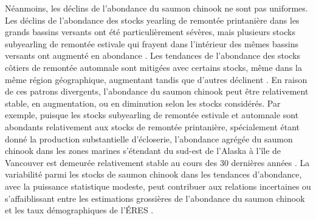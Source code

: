 Néanmoins, les déclins de l'abondance du saumon chinook ne sont pas uniformes. Les déclins de l'abondance des stocks yearling de remontée printanière dans les grands bassins versants ont été particulièrement sévères, mais plusieurs stocks subyearling de remontée estivale qui frayent dans l'intérieur des mêmes bassins versants ont augmenté en abondance \citep{cosewicChinookSalmonOncorhynchus2018, ctc2021AnnualReport2022, atlasTrendsChinookSalmon2023}. Les tendances de l'abondance des stocks côtiers de remontée automnale sont mitigées avec certains stocks, même dans la même région géographique, augmentant tandis que d'autres déclinent \citep{ctc2021AnnualReport2022, atlasTrendsChinookSalmon2023}. En raison de ces patrons divergents, l'abondance du saumon chinook peut être relativement stable, en augmentation, ou en diminution selon les stocks considérés. Par exemple, puisque les stocks subyearling de remontée estivale et automnale sont abondants relativement aux stocks de remontée printanière, spécialement étant donné la production substantielle d'écloserie, l'abondance agrégée du saumon chinook dans les zones marines s'étendant du sud-est de l'Alaska à l'île de Vancouver est demeurée relativement stable au cours des 30 dernières années \citep{ctc2021AnnualReport2022}. La variabilité parmi les stocks de saumon chinook dans les tendances d'abondance, avec la puissance statistique modeste, peut contribuer aux relations incertaines ou s'affaiblissant entre les estimations grossières de l'abondance du saumon chinook et les taux démographiques de l'ÉRES \citep{nelsonIdentifyingDriversDemographic2024}.

